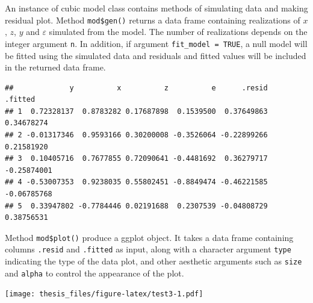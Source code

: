 \documentclass{monashthesis}
\begin{document}
An instance of cubic model class contains methods of simulating data and making residual plot. Method \texttt{mod\$gen()} returns a data frame containing realizations of \(x\), \(z\), \(y\) and \(\varepsilon\) simulated from the model. The number of realizations depends on the integer argument \texttt{n}. In addition, if argument \texttt{fit\_model\ =\ TRUE}, a null model will be fitted using the simulated data and residuals and fitted values will be included in the returned data frame.

\begin{Shaded}
\begin{Highlighting}[]
\SpecialCharTok{$}\NormalTok{(} \NormalTok{, } \NormalTok{)}
\end{Highlighting}
\end{Shaded}

\begin{verbatim}
##             y          x          z          e      .resid     .fitted
## 1  0.72328137  0.8783282 0.17687898  0.1539500  0.37649863  0.34678274
## 2 -0.01317346  0.9593166 0.30200008 -0.3526064 -0.22899266  0.21581920
## 3  0.10405716  0.7677855 0.72090641 -0.4481692  0.36279717 -0.25874001
## 4 -0.53007353  0.9238035 0.55802451 -0.8849474 -0.46221585 -0.06785768
## 5  0.33947802 -0.7784446 0.02191688  0.2307539 -0.04808729  0.38756531
\end{verbatim}

Method \texttt{mod\$plot()} produce a ggplot \autocite{wickham_ggplot2_2011} object. It takes a data frame containing columns \texttt{.resid} and \texttt{.fitted} as input, along with a character argument \texttt{type} indicating the type of the data plot, and other aesthetic arguments such as \texttt{size} and \texttt{alpha} to control the appearance of the plot.

\begin{Shaded}
\begin{Highlighting}[]
\SpecialCharTok{$}\SpecialCharTok{$}\NormalTok{(} \NormalTok{, } \NormalTok{), } \NormalTok{, } \NormalTok{)}
\end{Highlighting}
\end{Shaded}

\texttt{[image: thesis\_files/figure-latex/test3-1.pdf]}
\end{document}
